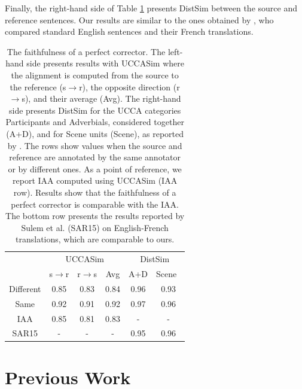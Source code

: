 \documentclass[letter,11pt]{article}
\begin{document}
Finally, the right-hand side of Table \ref{tab:Distances} presents {\sc DistSim}
between the source and reference sentences.
Our results are similar to the ones obtained by ,
who compared standard English sentences and their French translations.



\begin{table}[h!]
  \small
  \centering
  \singlespacing
  \begin{tabular}{c|c|c|c||c|c|}
  	\cline{2-6} 
  	& \multicolumn{3}{c||}{\sc UCCASim} & \multicolumn{2}{c|}{\sc DistSim}\\ \cline{2-6}
  	& s$\rightarrow$r & r$\rightarrow$s & Avg & A+D & Scene\
    \\
    \hline
    Different & 0.85 & 0.83 & 0.84 & 0.96 & 0.93
    \\
    Same & 0.92 & 0.91 & 0.92 & 0.97 & 0.96
    \\
    \hline
    \hline
    IAA & 0.85 & 0.81 & 0.83 & - & -
    \\
    \hline
    SAR15 & - & - & - & 0.95 & 0.96 \\
    \hline
  \end{tabular}
  \caption{\label{tab:Distances}
    The faithfulness of a perfect corrector. The left-hand side presents results with {\sc UCCASim}
    where the alignment is computed from the source to the reference (s$\rightarrow$r), the opposite direction
    (r$\rightarrow$s), and their average (Avg).
    The right-hand side presents {\sc DistSim} for the UCCA categories Participants and Adverbials, considered
    together (A+D), and for Scene units (Scene), as reported by \newcite{sulem2015conceptual}.
    The rows show values when the source and reference are annotated by the same annotator
    or by different ones. As a point of reference, we report IAA computed using {\sc UCCASim} (IAA row).
    Results show that the faithfulness of a perfect corrector is comparable with the IAA.
    The bottom row presents the results reported by Sulem et al. (SAR15) on English-French
    translations, which are comparable to ours.}
\end{table}


\section{Previous Work}\label{sec:prev_work}
\end{document}
